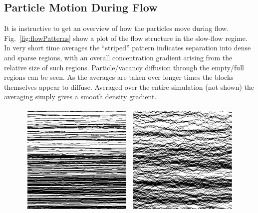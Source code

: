 \documentclass[
reprint, amsmath,amssymb, aps,
 pre, longbibliography,
]{revtex4-1}
\begin{document}
\subsection{Particle Motion During Flow}
It is instructive to get an overview of how the particles move during
flow. Fig.~\ref{fig:flowPatterns} show a plot of the flow structure in
the slow-flow regime.  In very short time averages the ``striped''
pattern indicates separation into dense and sparse regions, with an
overall concentration gradient arising from the relative size of such
regions.  Particle/vacancy diffusion through the empty/full regions
can be seen.  As the averages are taken over longer times the blocks themselves appear to diffuse.  Averaged over the entire simulation (not shown) the averaging simply gives a smooth density gradient.

\begin{figure}[h!]
\begin{center}
 \begin{tabular}{c | c}
    \includegraphics[width=0.49\linewidth]{shortTime}  &\includegraphics[width=0.49\linewidth]{midShortTime} \\
    \hline

\end{tabular}
\end{center}
\end{figure}
\end{document}
